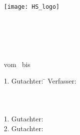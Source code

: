 \begin{titlepage}
\flushright\texttt{[image: HS\_logo]}

\vspace{1 cm}
\begin{center}
\linespread{1}
\LARGE\textbf{\arbeit} \\
\Large{\fakultaet} \\
\large{\degree}
\end{center}

\vspace{2 cm}

\begin{center}
\linespread{1}
\huge{\textbf{\titel}} \\
\vspace{1 cm}
\end{center}

\begin{center}
vom \ThesisStart \ bis \ThesisEnd
\end{center}


\vfill
\begin{tabbing}
1. Gutachter: \= \gutachterA  \kill 
Verfasser: \> \fullname \\
 \> \street \\
 \> \city \\
 \> \email \\
1. Gutachter: \> \gutachterA \\
2. Gutachter: \> \gutachterB \\
\end{tabbing}



\end{titlepage}